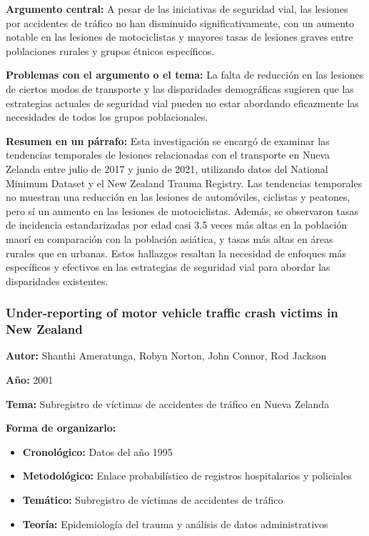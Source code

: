 \documentclass{book}
\begin{document}
\textbf{Argumento central:} A pesar de las iniciativas de seguridad vial, las lesiones por accidentes de tráfico no han disminuido significativamente, con un aumento notable en las lesiones de motociclistas y mayores tasas de lesiones graves entre poblaciones rurales y grupos étnicos específicos.

\textbf{Problemas con el argumento o el tema:} La falta de reducción en las lesiones de ciertos modos de transporte y las disparidades demográficas sugieren que las estrategias actuales de seguridad vial pueden no estar abordando eficazmente las necesidades de todos los grupos poblacionales.

\textbf{Resumen en un párrafo:} Esta investigación se encargó de examinar las tendencias temporales de lesiones relacionadas con el transporte en Nueva Zelanda entre julio de 2017 y junio de 2021, utilizando datos del National Minimum Dataset y el New Zealand Trauma Registry. 
Las tendencias temporales no muestran una reducción en las lesiones de automóviles, ciclistas y peatones, pero sí un aumento en las lesiones de motociclistas.
Además, se observaron tasas de incidencia estandarizadas por edad casi 3.5 veces más altas en la población maorí en comparación con la población asiática, y tasas más altas en áreas rurales que en urbanas. Estos hallazgos resaltan la necesidad de enfoques más específicos y efectivos en las estrategias de seguridad vial para abordar las disparidades existentes.


\subsubsection{Under-reporting of motor vehicle traffic crash victims in New Zealand}
\textbf{Autor:} Shanthi Ameratunga, Robyn Norton, John Connor, Rod Jackson

\textbf{Año:} 2001

\textbf{Tema:} Subregistro de víctimas de accidentes de tráfico en Nueva Zelanda

\textbf{Forma de organizarlo:}
\begin{itemize}
\setlength{\itemindent}{0.5in}
    \item \textbf{Cronológico:} Datos del año 1995
    \item \textbf{Metodológico:} Enlace probabilístico de registros hospitalarios y policiales
    \item \textbf{Temático:} Subregistro de víctimas de accidentes de tráfico
    \item \textbf{Teoría:} Epidemiología del trauma y análisis de datos administrativos
\end{itemize}
\end{document}

